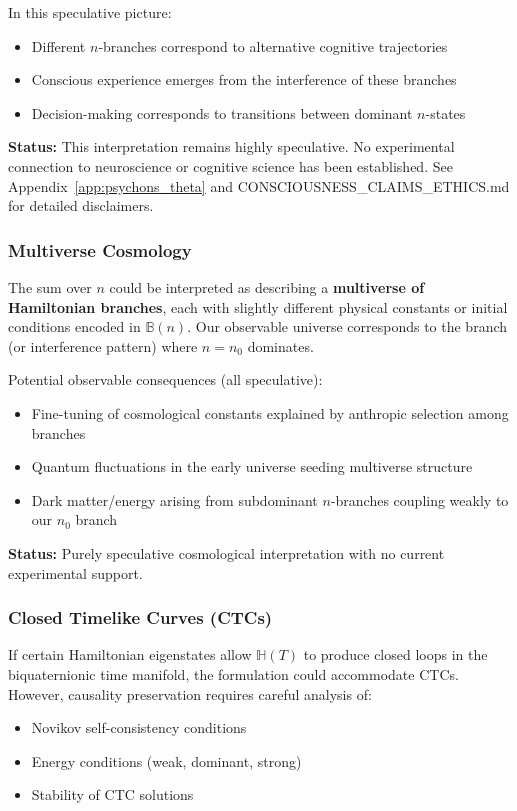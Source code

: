 In this speculative picture:
\begin{itemize}
\item Different $n$-branches correspond to alternative cognitive trajectories
\item Conscious experience emerges from the interference of these branches
\item Decision-making corresponds to transitions between dominant $n$-states
\end{itemize}

\textbf{Status:} This interpretation remains highly speculative. No experimental connection to neuroscience or cognitive science has been established. See Appendix~\ref{app:psychons_theta} and CONSCIOUSNESS\_CLAIMS\_ETHICS.md for detailed disclaimers.

\subsubsection{Multiverse Cosmology}

The sum over $n$ could be interpreted as describing a \textbf{multiverse of Hamiltonian branches}, each with slightly different physical constants or initial conditions encoded in $\mathbb{B}(n)$. Our observable universe corresponds to the branch (or interference pattern) where $n = n_0$ dominates.

Potential observable consequences (all speculative):
\begin{itemize}
\item Fine-tuning of cosmological constants explained by anthropic selection among branches
\item Quantum fluctuations in the early universe seeding multiverse structure
\item Dark matter/energy arising from subdominant $n$-branches coupling weakly to our $n_0$ branch
\end{itemize}

\textbf{Status:} Purely speculative cosmological interpretation with no current experimental support.

\subsubsection{Closed Timelike Curves (CTCs)}

If certain Hamiltonian eigenstates allow $\mathbb{H}(T)$ to produce closed loops in the biquaternionic time manifold, the formulation could accommodate CTCs. However, causality preservation requires careful analysis of:
\begin{itemize}
\item Novikov self-consistency conditions
\item Energy conditions (weak, dominant, strong)
\item Stability of CTC solutions
\end{itemize}

